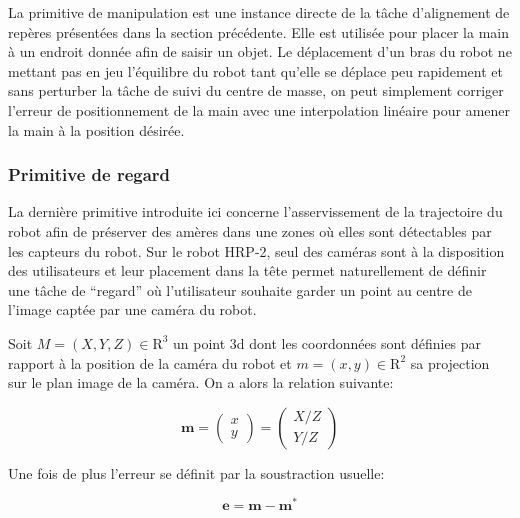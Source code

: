 La primitive de manipulation est une instance directe de la tâche
d'alignement de repères présentées dans la section précédente. Elle
est utilisée pour placer la main à un endroit donnée afin de saisir un
objet. Le déplacement d'un bras du robot ne mettant pas en jeu
l'équilibre du robot tant qu'elle se déplace peu rapidement et sans
perturber la tâche de suivi du centre de masse, on peut simplement
corriger l'erreur de positionnement de la main avec une interpolation
linéaire pour amener la main à la position désirée.


\subsubsection{Primitive de regard}


La dernière primitive introduite ici concerne l'asservissement de la
trajectoire du robot afin de préserver des amères dans une zones où
elles sont détectables par les capteurs du robot. Sur le robot HRP-2,
seul des caméras sont à la disposition des utilisateurs et leur
placement dans la tête permet naturellement de définir une tâche de
``regard'' où l'utilisateur souhaite garder un point au centre de
l'image captée par une caméra du robot.

Soit \mbox{$M = (X, Y, Z) \in \mathrm{R}^3$} un point 3d dont les
coordonnées sont définies par rapport à la position de la caméra du
robot et \mbox{$m = (x, y) \in \mathrm{R}^2$} sa projection sur le
plan image de la caméra. On a alors la relation suivante:

\begin{equation}
  \mathbf{m} = \left(
  \begin{array}{c}
    x\\
    y
  \end{array}
  \right) = \left(
  \begin{array}{c}
    X / Z\\
    Y / Z
  \end{array}
  \right)
\end{equation}


Une fois de plus l'erreur se définit par la soustraction usuelle:

\begin{equation}
  \mathbf{e} = \mathbf{m} - \mathbf{m}^*
\end{equation}

